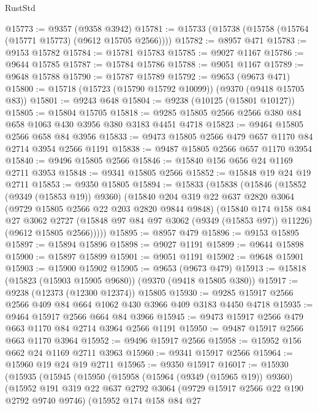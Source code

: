 \begin{lexlean}{RustStd}
\begin{coremodule}
@15773 := @9357 (@9358 @3942)
@15781 := @15733 (@15738 (@15758 (@15764 (@15771 @15773) (@9612 @15705 @2566))))
@15782 := @8957 @471
@15783 := @9153 @15782
@15784 := @15781 @15783
@15785 := @9027 @1167
@15786 := @9644 @15785
@15787 := @15784 @15786
@15788 := @9051 @1167
@15789 := @9648 @15788
@15790 := @15787 @15789
@15792 := @9653 (@9673 @471)
@15800 := @15718 (@15723 (@15790 @15792 @10099)) (@9370 (@9418 @15705 @83))
@15801 := @9243 @648
@15804 := @9238 (@10125 (@15801 @10127))
@15805 := @15804 @15705
@15818 := @9285 @15805 @2566 @2566 @380 @84 @658 @1063 @430 @3956 @380 @3183 @4451 @4718
@15823 := @9464 @15805 @2566 @658 @84 @3956
@15833 := @9473 @15805 @2566 @479 @657 @1170 @84 @2714 @3954 @2566 @1191
@15838 := @9487 @15805 @2566 @657 @1170 @3954
@15840 := @9496 @15805 @2566
@15846 := @15840 @156 @656 @24 @1169 @2711 @3953
@15848 := @9341 @15805 @2566
@15852 := @15848 @19 @24 @19 @2711
@15853 := @9350 @15805
@15894 := @15833
    (@15838
      (@15846
        (@15852 (@9349 (@15853 @19)) @9360)
        (@15840
          @204
          @319
          @22
          @637
          @2820
          @3064
          (@9729 @15805 @2566 @22 @203 @2820 @9844 @9848)
          (@15840
            @174
            @158
            @84
            @27
            @3062
            @2727
            (@15848 @97 @84 @97 @3062 (@9349 (@15853 @97)) @11226)
            (@9612 @15805 @2566)))))
@15895 := @8957 @479
@15896 := @9153 @15895
@15897 := @15894 @15896
@15898 := @9027 @1191
@15899 := @9644 @15898
@15900 := @15897 @15899
@15901 := @9051 @1191
@15902 := @9648 @15901
@15903 := @15900 @15902
@15905 := @9653 (@9673 @479)
@15913 := @15818 (@15823 (@15903 @15905 @9680)) (@9370 (@9418 @15805 @380))
@15917 := @9238 (@12373 (@12300 @12374)) @15805
@15930 := @9285 @15917 @2566 @2566 @409 @84 @664 @1062 @430 @3966 @409 @3183 @4450 @4718
@15935 := @9464 @15917 @2566 @664 @84 @3966
@15945 := @9473 @15917 @2566 @479 @663 @1170 @84 @2714 @3964 @2566 @1191
@15950 := @9487 @15917 @2566 @663 @1170 @3964
@15952 := @9496 @15917 @2566
@15958 := @15952 @156 @662 @24 @1169 @2711 @3963
@15960 := @9341 @15917 @2566
@15964 := @15960 @19 @24 @19 @2711
@15965 := @9350 @15917
@16017 := @15930
    (@15935
      (@15945
        (@15950
          (@15958
            (@15964 (@9349 (@15965 @19)) @9360)
            (@15952
              @191
              @319
              @22
              @637
              @2792
              @3064
              (@9729 @15917 @2566 @22 @190 @2792 @9740 @9746)
              (@15952
                @174
                @158
                @84
                @27

\end{coremodule}
\end{lexlean}
